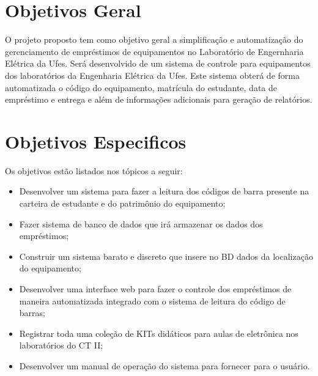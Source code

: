 \vspace{-42pt}
\section[Objetivos Geral]{Objetivos Geral}

O projeto proposto tem como objetivo geral a simplificação e automatização do gerenciamento de empréstimos de equipamentos no Laboratório de Engernharia Elétrica da Ufes. Será desenvolvido de um sistema de controle para equipamentos dos laboratórios da Engenharia Elétrica da Ufes. Este sistema obterá de forma automatizada o código do equipamento, matrícula do estudante, data de empréstimo e entrega e além de informações adicionais para geração de relatórios.  



\section[Objetivos Específicos]{Objetivos Especificos}
Os objetivos estão listados nos tópicos a seguir:

\begin{itemize}
   \item Desenvolver um sistema para fazer a leitura dos códigos de barra presente na carteira de estudante e do patrimônio do equipamento;
   \item Fazer sistema de banco de dados que irá armazenar os dados dos empréstimos;
   \item Construir um sistema barato e discreto que insere no BD dados da localização do equipamento;
   \item Desenvolver uma interface web para fazer o controle dos empréstimos de maneira automatizada integrado com o sistema de leitura do código de barras;
   \item Registrar toda uma coleção de KITs didáticos para aulas de eletrônica nos laboratórios do CT II;
   \item Desenvolver um manual de operação do sistema para fornecer para o usuário.
\end{itemize}
